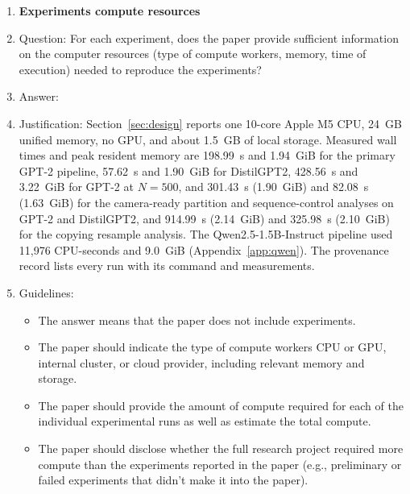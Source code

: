\begin{enumerate}
\item {\bf Experiments compute resources}
    \item[] Question: For each experiment, does the paper provide sufficient information on the computer resources (type of compute workers, memory, time of execution) needed to reproduce the experiments?
    \item[] Answer: \answerYes{}
    \item[] Justification: Section~\ref{sec:design} reports one 10-core Apple M5 CPU, 24~GB unified memory, no GPU, and about 1.5~GB of local storage. Measured wall times and peak resident memory are 198.99~s and 1.94~GiB for the primary GPT-2 pipeline, 57.62~s and 1.90~GiB for DistilGPT2, 428.56~s and 3.22~GiB for GPT-2 at $N=500$, and 301.43~s (1.90~GiB) and 82.08~s (1.63~GiB) for the camera-ready partition and sequence-control analyses on GPT-2 and DistilGPT2, and 914.99~s (2.14~GiB) and 325.98~s (2.10~GiB) for the copying resample analysis. The Qwen2.5-1.5B-Instruct pipeline used 11{,}976 CPU-seconds and 9.0~GiB (Appendix~\ref{app:qwen}). The provenance record lists every run with its command and measurements.
    \item[] Guidelines:
    \begin{itemize}
        \item The answer \answerNA{} means that the paper does not include experiments.
        \item The paper should indicate the type of compute workers CPU or GPU, internal cluster, or cloud provider, including relevant memory and storage.
        \item The paper should provide the amount of compute required for each of the individual experimental runs as well as estimate the total compute. 
        \item The paper should disclose whether the full research project required more compute than the experiments reported in the paper (e.g., preliminary or failed experiments that didn't make it into the paper). 
    \end{itemize}
    

\end{enumerate}
